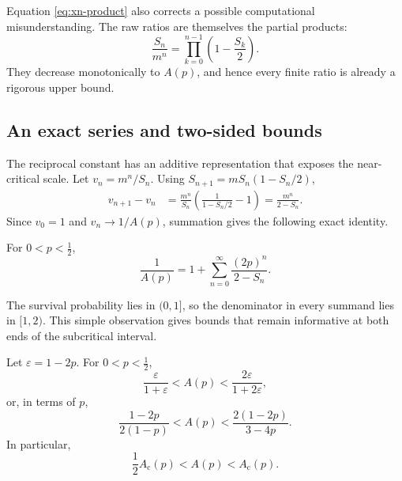 Equation \eqref{eq:xn-product} also corrects a possible computational
misunderstanding.  The raw ratios are themselves the partial products:
\begin{equation}
  \frac{S_n}{m^n}=\prod_{k=0}^{n-1}
  \left(1-\frac{S_k}{2}\right).
  \label{eq:ratio-is-product}
\end{equation}
They decrease monotonically to \(A(p)\), and hence every finite ratio is already
a rigorous upper bound.

\subsection{An exact series and two-sided bounds}
\label{sec:Abounds}

The reciprocal constant has an additive representation that exposes the
near-critical scale.  Let \(v_n=m^n/S_n\).  Using
\(S_{n+1}=mS_n(1-S_n/2)\),
\begin{align}
  v_{n+1}-v_n
  &=\frac{m^n}{S_n}
    \left(\frac{1}{1-S_n/2}-1\right)
    =\frac{m^n}{2-S_n}.
  \label{eq:vn-increment}
\end{align}
Since \(v_0=1\) and \(v_n\to1/A(p)\), summation gives the following exact
identity.

\begin{proposition}
For \(0<p<\tfrac12\),
\begin{equation}
  \frac{1}{A(p)}
  =1+\sum_{n=0}^{\infty}\frac{(2p)^n}{2-S_n}.
  \label{eq:Aseries}
\end{equation}
\end{proposition}

The survival probability lies in \((0,1]\), so the denominator in every summand
lies in \([1,2)\).  This simple observation gives bounds that remain informative
at both ends of the subcritical interval.

\begin{proposition}
Let \(\varepsilon=1-2p\).  For \(0<p<\tfrac12\),
\begin{equation}
  \frac{\varepsilon}{1+\varepsilon}
  <A(p)<
  \frac{2\varepsilon}{1+2\varepsilon},
  \label{eq:Abounds}
\end{equation}
or, in terms of \(p\),
\begin{equation}
  \frac{1-2p}{2(1-p)}
  <A(p)<
  \frac{2(1-2p)}{3-4p}.
  \label{eq:Aboundsexplicit}
\end{equation}
In particular,
\begin{equation}
  \frac12A_{\mathrm c}(p)<A(p)<A_{\mathrm c}(p).
  \label{eq:Ac-comparison-bound}
\end{equation}
\end{proposition}

